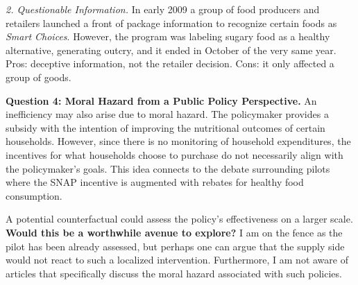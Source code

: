 \documentclass[11.5pt]{article}
\begin{document}
\textit{2. Questionable Information.} In early 2009 a group of food producers and retailers launched a front of package information to recognize certain foods as \textit{Smart Choices}. However, the program was labeling sugary food as a healthy alternative, generating outcry, and it ended in October of the very same year. Pros: deceptive information, not the retailer decision. Cons: it only affected a group of goods. 

\newpage 

\textbf{Question 4: Moral Hazard from a Public Policy Perspective.}
An inefficiency may also arise due to moral hazard. The policymaker provides a subsidy with the intention of improving the nutritional outcomes of certain households. However, since there is no monitoring of household expenditures, the incentives for what households choose to purchase do not necessarily align with the policymaker’s goals. This idea connects to the debate surrounding pilots where the SNAP incentive is augmented with rebates for healthy food consumption. 

A potential counterfactual could assess the policy’s effectiveness on a larger scale. \textbf{Would this be a worthwhile avenue to explore?} I am on the fence as the pilot has been already assessed, but perhaps one can argue that the supply side would not react to such a localized intervention. Furthermore, I am not aware of articles that specifically discuss the moral hazard associated with such policies.






\newpage



\newpage
\end{document}
